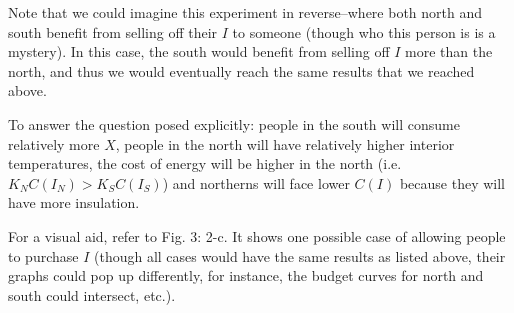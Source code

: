 \documentclass[12pt]{paper}
\begin{document}
Note that we could imagine this experiment in reverse--where both north and south benefit from selling off their $I$ to someone (though who this person is is a mystery). In this case, the south would benefit from selling off $I$ more than the north, and thus we would eventually reach the same results that we reached above.


To answer the question posed explicitly: people in the south will consume relatively more $X$, people in the north will have relatively higher interior temperatures, the cost of energy will be higher in the north (i.e. $K_NC(I_N)>K_SC(I_S)$) and northerns will face lower $C(I)$ because they will have more insulation.

For a visual aid, refer to Fig. 3: 2-c. It shows one possible case of allowing people to purchase $I$ (though all cases would have the same results as listed above, their graphs could pop up differently, for instance, the budget curves for north and south could intersect, etc.).
\end{document}
